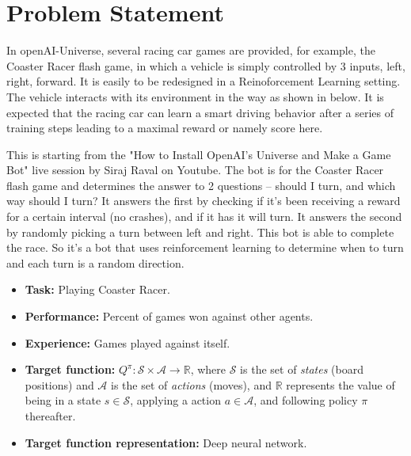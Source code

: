 \documentclass{article}
\begin{document}
\section{Problem Statement}
\label{sec:problem-statement}

\newcommand{\URLcf}{https://en.wikipedia.org/wiki/Connect_Four}

In openAI-Universe, several racing car games are provided, for example, the Coaster Racer flash game, in which a vehicle is simply controlled by 3 inputs, left, right, forward. It is easily to be redesigned in a Reinoforcement Learning setting. The vehicle interacts with its environment in the way as shown in below. It is expected that the racing car can learn a smart driving behavior after a series of training steps leading to a maximal reward or namely score here.

This is starting from the "How to Install OpenAI's Universe and Make a Game Bot" live session by Siraj Raval on Youtube. The bot is for the Coaster Racer flash game and determines the answer to 2 questions -- should I turn, and which way should I turn? It answers the first by checking if it's been receiving a reward for a certain interval (no crashes), and if it has it will turn. It answers the second by randomly picking a turn between left and right. This bot is able to complete the race. So it's a bot that uses reinforcement learning to determine when to turn and each turn is a random direction.

\begin{itemize}

    \item \textbf{Task:} Playing Coaster Racer.

    \item \textbf{Performance:} Percent of games won against other agents.

    \item \textbf{Experience:} Games played against itself.

    \item \textbf{Target function:} $Q^\pi : \mathcal{S} \times \mathcal{A} \to \mathbb{R}$, where
        $\mathcal{S}$ is the set of \emph{states} (board positions) and $\mathcal{A}$ is the set of
        \emph{actions} (moves), and $\mathbb{R}$ represents the value of being in a state $s \in
        \mathcal{S}$, applying a action $a \in \mathcal{A}$, and following policy $\pi$ thereafter.

    \item \textbf{Target function representation:} Deep neural network.

\end{itemize}
\end{document}
